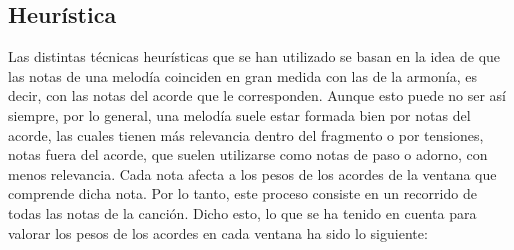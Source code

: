 \subsection{Heurística}\label{sec:arm:heuristica}

    Las distintas técnicas heurísticas que se han utilizado se basan en la idea de que las notas de una melodía coinciden en gran medida con las de la armonía, es decir, con las notas del acorde que le corresponden. Aunque esto puede no ser así siempre, por lo general, una melodía suele estar formada bien por notas del acorde, las cuales tienen más relevancia dentro del fragmento o por tensiones, notas fuera del acorde, que suelen utilizarse como notas de paso o adorno, con menos relevancia. Cada nota afecta a los pesos de los acordes de la ventana que comprende dicha nota. Por lo tanto, este proceso consiste en un recorrido de todas las notas de la canción. Dicho esto, lo que se ha tenido en cuenta para valorar los pesos de los acordes en cada ventana ha sido lo siguiente:

